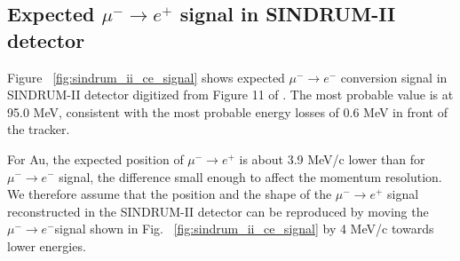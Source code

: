 \documentclass[12pt]{article}
\begin{document}
\subsection {Expected $\mu^- \rightarrow e^+$ signal in SINDRUM-II detector}

Figure ~\ref{fig:sindrum_ii_ce_signal} shows expected $\mu^- \rightarrow e^-$
conversion signal in SINDRUM-II detector digitized from Figure 11 of \cite{sindrum_ii:Bertl2006}. 
The most probable value is at 95.0 MeV, consistent with the most probable energy
losses of 0.6 MeV in front of the tracker.

For Au, the expected position of $\mu^-\rightarrow e^+$ is about 3.9 MeV/c lower than
for $\mu^- \rightarrow e^-$ signal, the difference small enough to affect the momentum
resolution.
%
We therefore assume that the position and the shape of the $\mu^-\rightarrow e^+$
signal reconstructed in the SINDRUM-II detector can be reproduced by moving
the $\mu^- \rightarrow e^- $signal shown in Fig. ~\ref{fig:sindrum_ii_ce_signal}
by 4 MeV/c towards lower energies.

\vspace{0.1in}
\vspace{0.1in}
\end{document}
